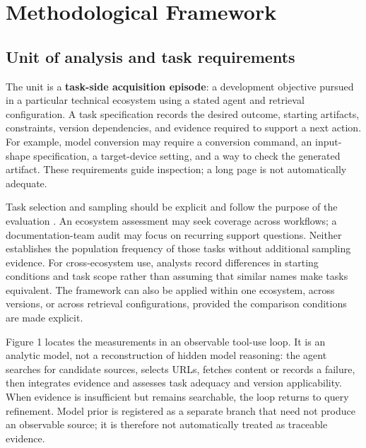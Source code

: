 \documentclass[manuscript,review,anonymous]{acmart}
\begin{document}
\section{Methodological Framework}\label{methodological-framework}

\subsection{Unit of analysis and task requirements}\label{unit-of-analysis-and-task-requirements}

The unit is a \textbf{task-side acquisition episode}: a development objective pursued in a particular technical ecosystem using a stated agent and retrieval configuration. A task specification records the desired outcome, starting artifacts, constraints, version dependencies, and evidence required to support a next action. For example, model conversion may require a conversion command, an input-shape specification, a target-device setting, and a way to check the generated artifact. These requirements guide inspection; a long page is not automatically adequate.

Task selection and sampling should be explicit and follow the purpose of the evaluation \citep{kelly2009}. An ecosystem assessment may seek coverage across workflows; a documentation-team audit may focus on recurring support questions. Neither establishes the population frequency of those tasks without additional sampling evidence. For cross-ecosystem use, analysts record differences in starting conditions and task scope rather than assuming that similar names make tasks equivalent. The framework can also be applied within one ecosystem, across versions, or across retrieval configurations, provided the comparison conditions are made explicit.

Figure 1 locates the measurements in an observable tool-use loop. It is an analytic model, not a reconstruction of hidden model reasoning: the agent searches for candidate sources, selects URLs, fetches content or records a failure, then integrates evidence and assesses task adequacy and version applicability. When evidence is insufficient but remains searchable, the loop returns to query refinement. Model prior is registered as a separate branch that need not produce an observable source; it is therefore not automatically treated as traceable evidence.
\end{document}
